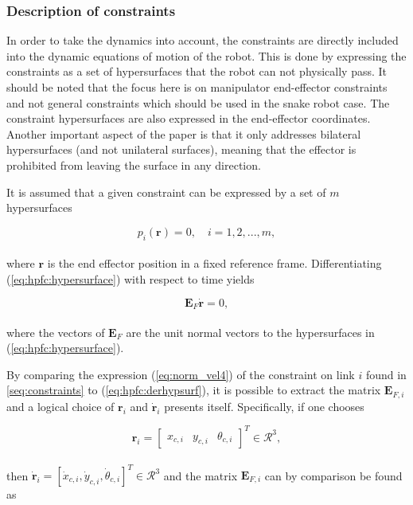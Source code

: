 \subsubsection{Description of constraints}

In order to take the dynamics into account, the constraints are directly included into the dynamic equations of motion of the robot. This is done by expressing the constraints as a set of hypersurfaces that the robot can not physically pass. It should be noted that the focus here is on manipulator end-effector constraints and not general constraints which should be used in the snake robot case. The constraint hypersurfaces are also expressed in the end-effector coordinates. Another important aspect of the paper is that it only addresses bilateral hypersurfaces (and not unilateral surfaces), meaning that the effector is prohibited from leaving the surface in any direction.

It is assumed that a given constraint can be expressed by a set of $m$ hypersurfaces

\begin{equation}\label{eq:hpfc:hypersurface}
    p_i(\mathbf{r}) = 0, \quad i = 1, 2, ..., m,
\end{equation}
\\
where $\mathbf{r}$ is the end effector position in a fixed reference frame. Differentiating (\ref{eq:hpfc:hypersurface}) with respect to time yields

\begin{equation}\label{eq:hpfc:derhypsurf}
    \mathbf{E}_F \mathbf{\dot{r}} = 0,
\end{equation}
\\
where the vectors of $\mathbf{E}_F$ are the unit normal vectors to the hypersurfaces in (\ref{eq:hpfc:hypersurface}).

By comparing the expression (\ref{eq:norm_vel4}) of the constraint on link $i$ found in \ref{seq:constraints} to (\ref{eq:hpfc:derhypsurf}), it is possible to extract the matrix $\mathbf{E}_{F,i}$ and a logical choice of $\mathbf{r}_i$ and $\mathbf{\dot{r}}_i$ presents itself.
Specifically, if one chooses

\begin{equation}
    \mathbf{r}_i =
    \begin{bmatrix}
        x_{c,i} & y_{c,i} & \theta_{c,i}
    \end{bmatrix}^T \in \mathcal{R}^3,
\end{equation}
\\
then $\mathbf{\dot{r}}_i = [\dot{x}_{c,i}, \dot{y}_{c,i}, \dot{\theta}_{c,i}]^T \in \mathcal{R}^3$ and the matrix $\mathbf{E}_{F,i}$ can by comparison be found as

